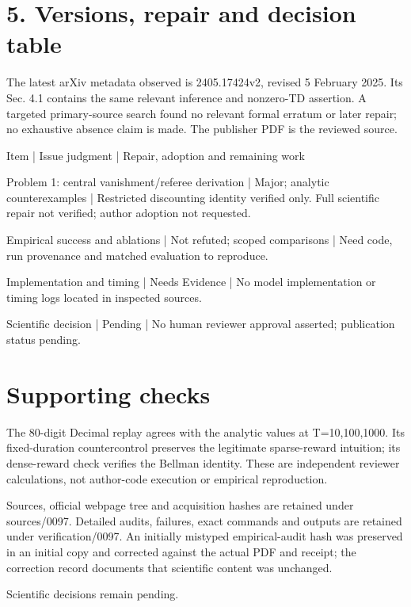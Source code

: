 \documentclass[10pt]{article}
\begin{document}
\section*{5. Versions, repair and decision table}
The latest arXiv metadata observed is 2405.17424v2, revised 5 February 2025. Its Sec. 4.1 contains the same relevant inference and nonzero-TD assertion. A targeted primary-source search found no relevant formal erratum or later repair; no exhaustive absence claim is made. The publisher PDF is the reviewed source.\par
Item | Issue judgment | Repair, adoption and remaining work\par
Problem 1: central vanishment/referee derivation | Major; analytic counterexamples | Restricted discounting identity verified only. Full scientific repair not verified; author adoption not requested.\par
Empirical success and ablations | Not refuted; scoped comparisons | Need code, run provenance and matched evaluation to reproduce.\par
Implementation and timing | Needs Evidence | No model implementation or timing logs located in inspected sources.\par
Scientific decision | Pending | No human reviewer approval asserted; publication status pending.\par
\section*{Supporting checks}
The 80-digit Decimal replay agrees with the analytic values at T=10,100,1000. Its fixed-duration countercontrol preserves the legitimate sparse-reward intuition; its dense-reward check verifies the Bellman identity. These are independent reviewer calculations, not author-code execution or empirical reproduction.\par
Sources, official webpage tree and acquisition hashes are retained under sources/0097. Detailed audits, failures, exact commands and outputs are retained under verification/0097. An initially mistyped empirical-audit hash was preserved in an initial copy and corrected against the actual PDF and receipt; the correction record documents that scientific content was unchanged.\par
Scientific decisions remain pending.\par
\end{document}
